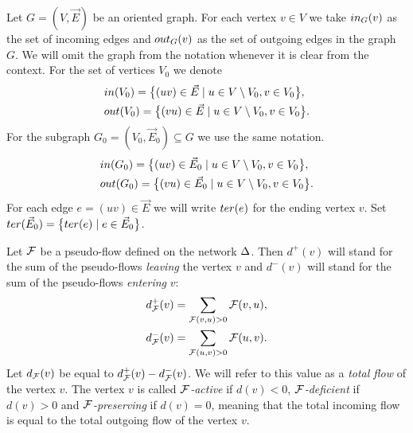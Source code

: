 \documentclass[12pt,oneside,a4paper]{amsart}
\begin{document}
      \begin{definition}
        Let $G = (V, \vec{E})$ be an oriented graph.
        For each vertex $v \in V$ we take $in_G(v)$ as the set of incoming edges
          and $out_G(v)$ as the set of outgoing edges in the graph $G$.
        We will omit the graph from the notation whenever it is clear from the context.
        For the set of vertices $V_0$ we denote
        \begin{align*}
          &in(V_0) = \big\{(uv)\in \vec{E} \mid u \in V \setminus V_0, v \in V_0\big\},\\
          &out(V_0) = \big\{(vu) \in \vec{E} \mid u \in V\setminus V_0, v \in V_0\big\}.
        \end{align*}
        For the subgraph $G_0 = (V_0, \vec{E}_0) \subseteq G$ we use the same notation.
        \begin{align*}
          &in(G_0) = \big\{(uv)\in \vec{E}_0 \mid u \in V \setminus V_0, v \in V_0\big\},\\
          &out(G_0) = \big\{(vu) \in \vec{E}_0 \mid u \in V\setminus V_0, v \in V_0\big\}.
        \end{align*}
        For each edge $e=(uv) \in \vec{E}$ we will write %
          $ter(e)$ for the ending vertex $v$.
        Set $ter(\vec{E}_0) = \big\{ter(e) \mid e\in \vec{E}_0\big\}$.
      \end{definition}
      \begin{definition}
        Let $\mathcal{F}$ be a pseudo-flow defined on the network $\Delta$.
        Then $d^{+}(v)$ will stand for the sum of the pseudo-flows \emph{leaving} the vertex $v$ and
        $d^{-}(v)$ will stand for the sum of the pseudo-flows \emph{entering} $v$:
        \begin{align*}
          &d^{+}_{\mathcal{F}}(v) = \sum_{\mathcal{F}(v, u) > 0} \mathcal{F}(v,u),\\
          &d^{-}_{\mathcal{F}}(v) = \sum_{\mathcal{F}(u, v) > 0} \mathcal{F}(u,v).
        \end{align*}
        Let $d_{\mathcal{F}}(v)$ be equal to $d^{+}_{\mathcal{F}}(v) - d^{-}_{\mathcal{F}}(v)$.
        We will refer to this value as a \emph{total flow} of the vertex $v$.
        The vertex $v$ is called \emph{$\mathcal{F}$-active} if $d(v) < 0$,
          \emph{$\mathcal{F}$-deficient} if $d(v) > 0$ and
          \emph{$\mathcal{F}$-preserving} if $d(v) = 0$, meaning that the total incoming flow
          is equal to the total outgoing flow of the vertex $v$.
      \end{definition}
\end{document}
